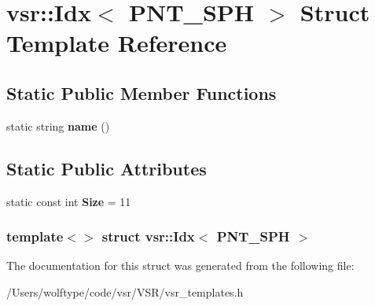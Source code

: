 \hypertarget{structvsr_1_1_idx_3_01_p_n_t___s_p_h_01_4}{\section{vsr\-:\-:Idx$<$ P\-N\-T\-\_\-\-S\-P\-H $>$ Struct Template Reference}
\label{structvsr_1_1_idx_3_01_p_n_t___s_p_h_01_4}
}
\subsection*{Static Public Member Functions}
\begin{DoxyCompactItemize}
\item 
\hypertarget{structvsr_1_1_idx_3_01_p_n_t___s_p_h_01_4_ad099a880a1a94407b5838653ee2c41fc}{static string {\bfseries name} ()}\label{structvsr_1_1_idx_3_01_p_n_t___s_p_h_01_4_ad099a880a1a94407b5838653ee2c41fc}

\end{DoxyCompactItemize}
\subsection*{Static Public Attributes}
\begin{DoxyCompactItemize}
\item 
\hypertarget{structvsr_1_1_idx_3_01_p_n_t___s_p_h_01_4_ab2bde2e428c11d10ca350b745a02b24c}{static const int {\bfseries Size} = 11}\label{structvsr_1_1_idx_3_01_p_n_t___s_p_h_01_4_ab2bde2e428c11d10ca350b745a02b24c}

\end{DoxyCompactItemize}
\subsubsection*{template$<$$>$ struct vsr\-::\-Idx$<$ P\-N\-T\-\_\-\-S\-P\-H $>$}



The documentation for this struct was generated from the following file\-:\begin{DoxyCompactItemize}
\item 
/\-Users/wolftype/code/vsr/\-V\-S\-R/vsr\-\_\-templates.\-h\end{DoxyCompactItemize}

